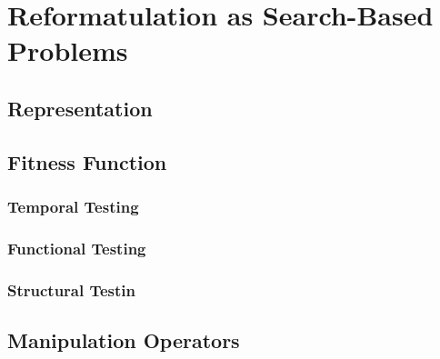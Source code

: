 \chapter{Reformatulation as Search-Based Problems}
\section{Representation}
\section{Fitness Function}
\subsection{Temporal Testing}
\subsection{Functional Testing}
\subsection{Structural Testin}
\section{Manipulation Operators}